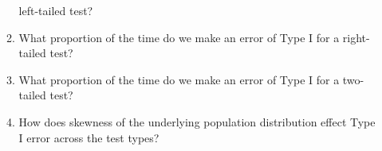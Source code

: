 \documentclass{article}\usepackage[]{graphicx}\usepackage[]{xcolor}
\begin{document}
\begin{enumerate}
\begin{enumerate}
    left-tailed test?
    \item What proportion of the time do we make an error of Type I for a
    right-tailed test?
    \item What proportion of the time do we make an error of Type I for a
    two-tailed test?
    \item How does skewness of the underlying population distribution effect
    Type I error across the test types?
  \end{enumerate}
\end{enumerate}

\end{document}
